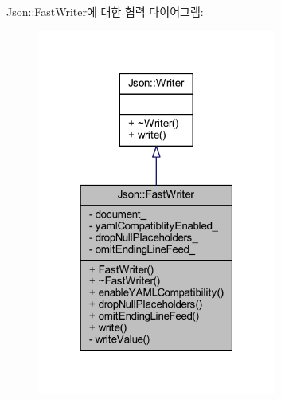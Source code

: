 Json\+:\+:Fast\+Writer에 대한 협력 다이어그램\+:\nopagebreak
\begin{figure}[H]
\begin{center}
\leavevmode
\includegraphics[width=223pt]{class_json_1_1_fast_writer__coll__graph}
\end{center}
\end{figure}
